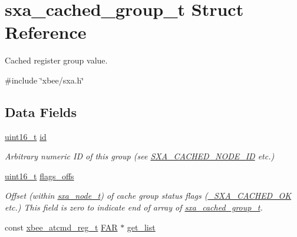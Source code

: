 \hypertarget{structsxa__cached__group__t}{\section{sxa\-\_\-cached\-\_\-group\-\_\-t Struct Reference}
\label{structsxa__cached__group__t}
}


Cached register group value.  




{\ttfamily \#include \char`\"{}xbee/sxa.\-h\char`\"{}}

\subsection*{Data Fields}
\begin{DoxyCompactItemize}
\item 
\hypertarget{structsxa__cached__group__t_a4fc3a0c58dfbd1e68224521185cb9384}{\hyperlink{group__hal_ga5a8b2dc9e45a9ee81a94ef304fb62505}{uint16\-\_\-t} \hyperlink{structsxa__cached__group__t_a4fc3a0c58dfbd1e68224521185cb9384}{id}}\label{structsxa__cached__group__t_a4fc3a0c58dfbd1e68224521185cb9384}

\begin{DoxyCompactList}\small\item\em Arbitrary numeric I\-D of this group (see \hyperlink{group___s_x_a_ggabed82baf7f470b522273a3e37c24c600a8d6b7f78660e6b7da06d0fa99dfb6df6}{S\-X\-A\-\_\-\-C\-A\-C\-H\-E\-D\-\_\-\-N\-O\-D\-E\-\_\-\-I\-D} etc.) \end{DoxyCompactList}\item 
\hyperlink{group__hal_ga5a8b2dc9e45a9ee81a94ef304fb62505}{uint16\-\_\-t} \hyperlink{structsxa__cached__group__t_a384f3d44ddc76275447a4027f7d7dc11}{flags\-\_\-offs}
\begin{DoxyCompactList}\small\item\em Offset (within \hyperlink{structsxa__node__t}{sxa\-\_\-node\-\_\-t}) of cache group status flags (\hyperlink{group___s_x_a_gga0411cd49bb5b71852cecd93bcbf0ca2da54498f64b3ad7c2be423d32b45deac04}{\-\_\-\-S\-X\-A\-\_\-\-C\-A\-C\-H\-E\-D\-\_\-\-O\-K} etc.) This field is zero to indicate end of array of \hyperlink{structsxa__cached__group__t}{sxa\-\_\-cached\-\_\-group\-\_\-t}. \end{DoxyCompactList}\item 
\hypertarget{structsxa__cached__group__t_a74693ee122171373c13f53dd39a0997e}{const \hyperlink{structxbee__atcmd__reg__t}{xbee\-\_\-atcmd\-\_\-reg\-\_\-t} \hyperlink{group__hal_gaef060b3456fdcc093a7210a762d5f2ed}{F\-A\-R} $\ast$ \hyperlink{structsxa__cached__group__t_a74693ee122171373c13f53dd39a0997e}{get\-\_\-list}}\label{structsxa__cached__group__t_a74693ee122171373c13f53dd39a0997e}


\end{DoxyCompactItemize}
